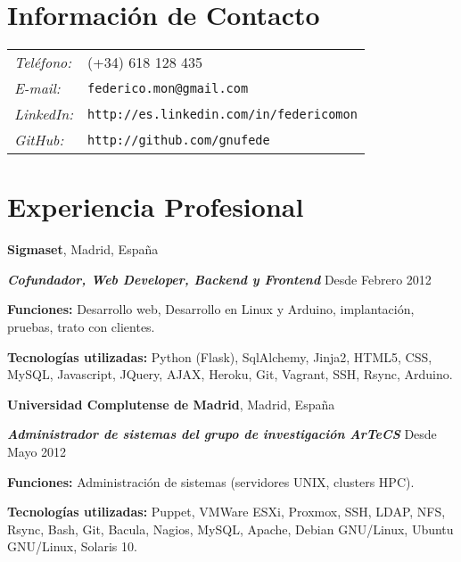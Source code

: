 \documentclass[margin,line]{resume}
\begin{document}
\address{Ingeniero en Informática}

\begin{resume}
\section{\sc Información de Contacto}
\vspace{.05in}
\begin{tabular}{@{}p{0.5in}p{2in}}
{\it Teléfono:} &(+34) 618 128 435 \\
{\it E-mail:} &{ \tt federico.mon@gmail.com}\\
{\it LinkedIn:} &{ \tt http://es.linkedin.com/in/federicomon}\\
{\it GitHub:} &{ \tt http://github.com/gnufede}\\
\end{tabular}

\section{\sc Experiencia Profesional}
{\bf Sigmaset}, Madrid, España

\vspace{-.3cm}
{\bf \em Cofundador, Web Developer, Backend y Frontend} \hfill
{ Desde Febrero 2012
}
\begin{list2}
\vspace*{.05in}
\item {\bf Funciones: }{ Desarrollo web, Desarrollo en Linux y Arduino, 
        implantación, pruebas, trato con clientes.}
\item {\bf Tecnologías utilizadas: }{Python (Flask), SqlAlchemy, Jinja2,
        HTML5, CSS, MySQL, Javascript, JQuery, AJAX,
        Heroku, Git, Vagrant,
        SSH, Rsync, Arduino.}
\end{list2}


{\bf Universidad Complutense de Madrid}, Madrid, España

\vspace{-.3cm}
{\bf \em Administrador de sistemas del grupo de investigación ArTeCS} \hfill
{ Desde Mayo 2012
}
\begin{list2}
\vspace*{.05in}
\item {\bf Funciones: }{Administración de sistemas (servidores UNIX, clusters HPC).}
\item {\bf Tecnologías utilizadas: }{Puppet, VMWare ESXi, Proxmox,
        SSH, LDAP, NFS, 
        Rsync, Bash, Git, 
        Bacula, Nagios, MySQL, Apache, Debian GNU/Linux, Ubuntu GNU/Linux, 
        Solaris 10.}
\end{list2}



\end{resume}
\end{document}
